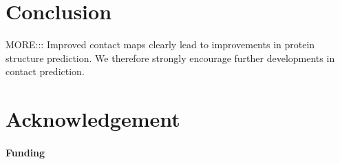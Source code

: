 \documentclass{bioinfo}
\begin{document}
\section{Conclusion}
MORE::: Improved contact maps clearly lead to improvements in protein structure prediction. We therefore strongly encourage further developments in contact prediction.

\section*{Acknowledgement}

\paragraph{Funding\textcolon} %


%
%
%
%
%
%
%

\end{document}
